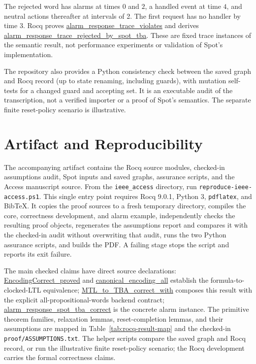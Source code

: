 \documentclass{ieeeaccess}
\newcommand{\Rocqid}[1]{\url{#1}}
\begin{document}
The rejected word has alarms at times $0$ and $2$, a handled event at time
$4$, and neutral actions thereafter at intervals of 2. The first request has
no handler by time 3. Rocq proves
\Rocqid{alarm_response_trace_violates} and derives
\Rocqid{alarm_response_trace_rejected_by_spot_tba}. These are fixed trace
instances of the semantic result, not performance experiments or validation
of Spot's implementation.

The repository also provides a Python consistency check between the saved
graph and Rocq record (up to state renaming, including guards), with mutation
self-tests for a changed guard and accepting set. It is an executable audit of
the transcription, not a verified importer or a proof of Spot's semantics.
The separate finite reset-policy scenario is illustrative.

\section{Artifact and Reproducibility}
\label{sec:artifact}
The accompanying artifact contains the Rocq source modules, checked-in
assumptions audit, Spot inputs and saved graphs, assurance scripts, and the
Access manuscript source. From the \texttt{ieee\_access} directory, run
\texttt{reproduce-ieee-access.ps1}. This single entry point requires Rocq
9.0.1, Python 3, \texttt{pdflatex}, and BibTeX. It copies the proof sources to
a fresh temporary directory, compiles the core, correctness development, and
alarm example, independently checks the resulting proof objects, regenerates
the assumptions report and compares it with the checked-in audit without
overwriting that audit, runs the two Python assurance scripts, and builds the
PDF. A failing stage stops the script and reports its exit failure.

The main checked claims have direct source declarations:
\Rocqid{EncodingCorrect\_proved} and
\Rocqid{canonical\_encoding\_all} establish the formula-to-clocked-LTL
equivalence; \Rocqid{MTL\_to\_TBA\_correct\_with} composes this result with
the explicit all-propositional-words backend contract;
\Rocqid{alarm\_response\_spot\_tba\_correct} is the concrete alarm
instance. The primitive theorem families, relaxation lemmas, reset-completion
lemmas, and their assumptions are mapped in
Table~\ref{tab:rocq-result-map} and the checked-in \texttt{proof/ASSUMPTIONS.txt}.
The helper scripts compare the saved graph and Rocq record, or run the
illustrative finite reset-policy scenario; the Rocq development carries the
formal correctness claims.
\end{document}
